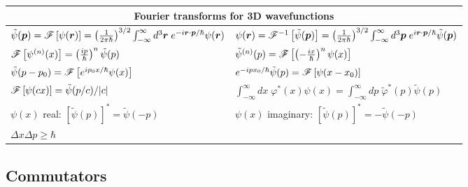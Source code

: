 \begin{table}[h!]
    \centering
    \begin{tabular}{l|l}
        \multicolumn{2}{c}{Fourier transforms for 3D wavefunctions}\\
        \hline
        $\tilde{\psi}(\bp)=\fourier{\psi(\bR)}=\left(\frac{1}{2\pi\hbar}\right)^{3/2}\int_{-\infty}^\infty d^3\bR\;e^{-i\bR\cdot\bp/\hbar}\psi(\bR)$&$\psi(\bR)=\ifourier{\tilde{\psi}(\bp)}=\left(\frac{1}{2\pi\hbar}\right)^{3/2}\int_{-\infty}^\infty d^3\bp\;e^{i\bR\cdot\bp/\hbar}\tilde{\psi}(\bp)$\\
        $\fourier{\psi^{(n)}(x)}=\left(\frac{ip}{\hbar}\right)^n\tilde{\psi}(p)$&$\tilde{\psi}^{(n)}(p)=\fourier{\left(-\frac{ix}{\hbar}\right)^n\psi(x)}$\\
        $\tilde{\psi}(p-p_0)=\fourier{e^{ip_0x/\hbar}\psi(x)}$&$e^{-ipx_0/\hbar}\tilde{\psi}(p)=\fourier{\psi(x-x_0)}$\\
        $\fourier{\psi(cx)}=\tilde{\psi}(p/c)/|c|$&$\int_{-\infty}^\infty dx\;\varphi^*(x)\psi(x)=\int_{-\infty}^\infty dp\;\tilde{\varphi}^*(p)\tilde{\psi}(p)$\\
        $\psi(x)$ real: $[\tilde{\psi}(p)]^*=\tilde{\psi}(-p)$&$\psi(x)$ imaginary: $[\tilde{\psi}(p)]^*=-\tilde{\psi}(-p)$\\
        $\Delta x\Delta p\geq\hbar$&$$
    \end{tabular}
\end{table}
\begin{comment}
\end{comment}
\subsection*{Commutators}
\begin{table}[h!]
    \centering
\end{table} 

